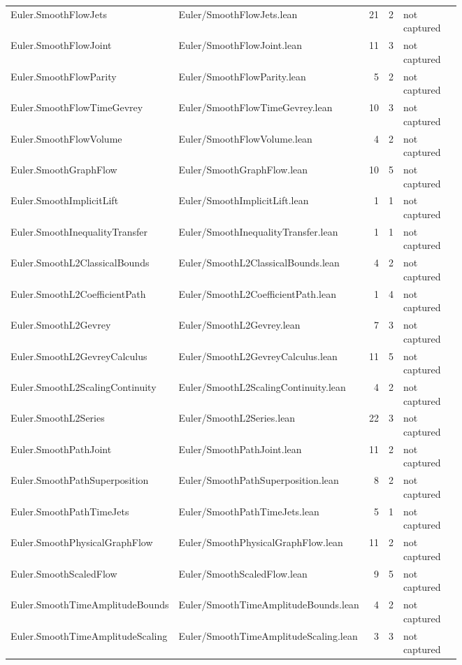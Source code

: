 \documentclass[10pt]{article}
\begin{document}
\begin{longtable}{p{0.28\linewidth}p{0.27\linewidth}r r p{0.20\linewidth}}
Euler.SmoothFlowJets & Euler/SmoothFlowJets.lean & 21 & 2 & not captured\\
Euler.SmoothFlowJoint & Euler/SmoothFlowJoint.lean & 11 & 3 & not captured\\
Euler.SmoothFlowParity & Euler/SmoothFlowParity.lean & 5 & 2 & not captured\\
Euler.SmoothFlowTimeGevrey & Euler/SmoothFlowTimeGevrey.lean & 10 & 3 & not captured\\
Euler.SmoothFlowVolume & Euler/SmoothFlowVolume.lean & 4 & 2 & not captured\\
Euler.SmoothGraphFlow & Euler/SmoothGraphFlow.lean & 10 & 5 & not captured\\
Euler.SmoothImplicitLift & Euler/SmoothImplicitLift.lean & 1 & 1 & not captured\\
Euler.SmoothInequalityTransfer & Euler/SmoothInequalityTransfer.lean & 1 & 1 & not captured\\
Euler.SmoothL2ClassicalBounds & Euler/SmoothL2ClassicalBounds.lean & 4 & 2 & not captured\\
Euler.SmoothL2CoefficientPath & Euler/SmoothL2CoefficientPath.lean & 1 & 4 & not captured\\
Euler.SmoothL2Gevrey & Euler/SmoothL2Gevrey.lean & 7 & 3 & not captured\\
Euler.SmoothL2GevreyCalculus & Euler/SmoothL2GevreyCalculus.lean & 11 & 5 & not captured\\
Euler.SmoothL2ScalingContinuity & Euler/SmoothL2ScalingContinuity.lean & 4 & 2 & not captured\\
Euler.SmoothL2Series & Euler/SmoothL2Series.lean & 22 & 3 & not captured\\
Euler.SmoothPathJoint & Euler/SmoothPathJoint.lean & 11 & 2 & not captured\\
Euler.SmoothPathSuperposition & Euler/SmoothPathSuperposition.lean & 8 & 2 & not captured\\
Euler.SmoothPathTimeJets & Euler/SmoothPathTimeJets.lean & 5 & 1 & not captured\\
Euler.SmoothPhysicalGraphFlow & Euler/SmoothPhysicalGraphFlow.lean & 11 & 2 & not captured\\
Euler.SmoothScaledFlow & Euler/SmoothScaledFlow.lean & 9 & 5 & not captured\\
Euler.SmoothTimeAmplitudeBounds & Euler/SmoothTimeAmplitudeBounds.lean & 4 & 2 & not captured\\
Euler.SmoothTimeAmplitudeScaling & Euler/SmoothTimeAmplitudeScaling.lean & 3 & 3 & not captured\\

\end{longtable}
\end{document}
